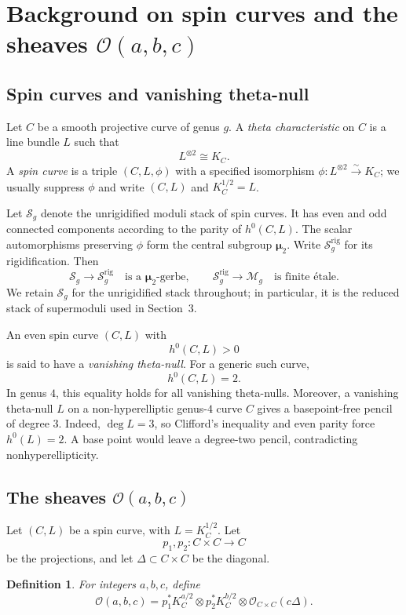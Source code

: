 \documentclass[10pt,a4paper]{amsart}
\newtheorem{definition}[theorem]{Definition}
\newcommand{\OO}{\mathcal O}
\newcommand{\MM}{\mathcal M}
\newcommand{\SSS}{\mathcal S}
\begin{document}
\section{Background on spin curves and the sheaves
\texorpdfstring{$\OO(a,b,c)$}{O(a,b,c)}}

\subsection{Spin curves and vanishing theta-null}

Let $C$ be a smooth projective curve of genus $g$. A \emph{theta characteristic} on $C$ is a line bundle $L$ such that
\[
L^{\otimes 2}\cong K_C.
\]
A \emph{spin curve} is a triple $(C,L,\phi)$ with a specified
isomorphism $\phi:L^{\otimes2}\xrightarrow{\sim}K_C$; we usually suppress
$\phi$ and write $(C,L)$ and $K_C^{1/2}=L$.

Let $\SSS_g$ denote the unrigidified moduli stack of spin curves.
It has even and odd connected components according to the parity of
$h^0(C,L)$. The scalar automorphisms preserving $\phi$ form the central
subgroup $\boldsymbol\mu_2$. Write $\SSS_g^{\mathrm{rig}}$ for its
rigidification. Then
\[
\SSS_g\longrightarrow\SSS_g^{\mathrm{rig}}
\quad\text{is a }\boldsymbol\mu_2\text{-gerbe},\qquad
\SSS_g^{\mathrm{rig}}\longrightarrow\MM_g
\quad\text{is finite \'etale}.
\]
We retain $\SSS_g$ for the unrigidified stack throughout; in particular,
it is the reduced stack of supermoduli used in Section~3.



An even spin curve $(C,L)$ with
\[
h^0(C,L)>0
\]
is said to have a \emph{vanishing theta-null}. For a generic such curve,
\[
h^0(C,L)=2.
\]
In genus $4$, this equality holds for all vanishing theta-nulls.
{Moreover, a vanishing theta-null $L$ on a non-hyperelliptic
genus-$4$ curve $C$ gives a basepoint-free pencil of degree $3$.}
{Indeed, $\deg L=3$, so Clifford's inequality and even parity force
$h^0(L)=2$. A base point would leave a degree-two pencil, contradicting
nonhyperellipticity.}

\subsection{The sheaves \texorpdfstring{$\OO(a,b,c)$}{O(a,b,c)}}

Let $(C,L)$ be a spin curve, with $L=K_C^{1/2}$. Let
\[
p_1,p_2:C\times C\to C
\]
be the projections, and let $\Delta\subset C\times C$ be the diagonal.

\begin{definition}
For integers $a,b,c$, define
\[
\OO(a,b,c)
=
p_1^*K_C^{a/2}\otimes p_2^*K_C^{b/2}\otimes \OO_{C\times C}(c\Delta).
\]
\end{definition}
\end{document}
